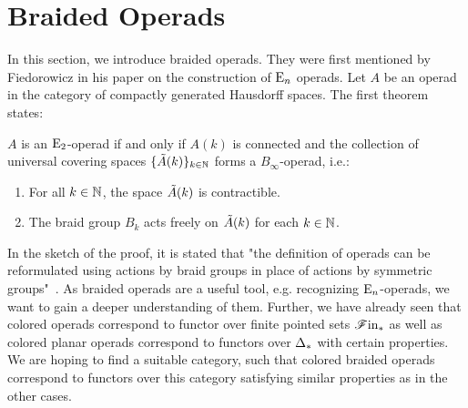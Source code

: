 
\section{Braided Operads}\label{sec:braidedoperads} 

    In this section, we introduce braided operads. They were first
    mentioned by Fiedorowicz in his paper \cite{EO} on the construction of
    $\operatorname{E}_n$ operads. Let $A$ be an operad in the  category of compactly generated
    Hausdorff spaces. The first theorem states:

    \begin{thm}
        $A$ is an $\operatorname{E}_2$-operad if and only if $A(k)$ is connected and the collection of
        universal covering spaces $\{\Tilde{A}(k)\}_{k \in \mathbb{N}}$ forms a
        $B_{\infty}$-operad, i.e.:
        \begin{enumerate}[(1)]
            \item For all $k \in \mathbb{N}$, the space $\Tilde{A}(k)$ is contractible.
            \item The braid group  $B_k$ acts freely on $\Tilde{A}(k)$ for each
            $k \in \mathbb{N}$.
        \end{enumerate}
    \end{thm}

    In the sketch of the proof, it is stated that "the definition of operads can
    be reformulated using actions by braid groups in place of actions by
    symmetric groups"~\cite{EO}. As braided operads are a useful tool, e.g.
    recognizing $\operatorname{E}_n$-operads, we want to gain a deeper understanding of
    them. Further, we have already seen that colored operads
    correspond to functor over finite pointed sets $\mathscr{F} \text{in}_{\ast}$ as well as
    colored planar operads correspond to functors over $\Delta_{\ast}$ with 
    certain properties. We are
    hoping to find a suitable category, such that colored braided operads
    correspond to functors over this category satisfying similar 
    properties as in the other cases. 
    

